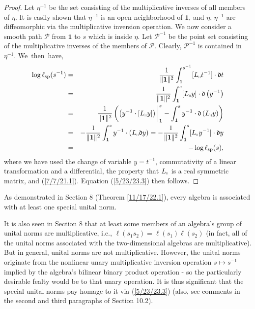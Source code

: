 \documentclass{amsart}
\numberwithin{equation}{section}
\theoremstyle{definition}
\numberwithin{theorem}{section}
\begin{document}
\begin{proof}
Let $\eta^{-1}$ be the set consisting of the multiplicative inverses of all members of $\eta$.  It is easily shown that $\eta^{-1}$ is an open neighborhood of $\mathbf{1}$, and $\eta$, $\eta^{-1}$ are diffeomorphic via the multiplicative inversion operation.  
We now consider a smooth path $\mathcal{P}$ from $\mathbf{1}$ to $s$ which is inside $\eta$.  Let $\mathcal{P}^{-1}$ be the point set consisting of the multiplicative inverses of the members of $\mathcal{P}$.  Clearly, $\mathcal{P}^{-1}$ is contained in $\eta^{-1}$. 
\mbox{We then have,} \begin{eqnarray}  \log \ell_{\rm sp}(s^{-1})   &=&   \frac{1}{\|{\bf 1}\|^2} \int_{\bf 1}^{s^{-1}} [L_{\shortparallel}t^{-1}] \cdot \mathfrak{d}t \nonumber \\ &=&  \frac{1}{\|{\bf 1}\|^2} \int_{\bf 1}^s [L_{\shortparallel}y]\cdot \mathfrak{d}\left(y^{-1}\right) \nonumber \\ &=&  \frac{1}{\|{\bf 1}\|^2}\left(\left(y^{-1}\cdot [L_{\shortparallel}y]\right)\bigg|_{\bf 1}^s - \int_{\bf 1}^s y^{-1}\cdot \mathfrak{d}\left(L_{\shortparallel}y\right)\right)   \nonumber \\ &=& -\frac{1}{\|{\bf 1}\|^2} \int_{\bf 1}^s y^{-1}\cdot (L_{\shortparallel}\mathfrak{d}y) = -\frac{1}{\|{\bf 1}\|^2} \int_{\bf 1}^s [L_{\shortparallel}y^{-1}] \cdot \mathfrak{d}y  \nonumber \\ &=& -\log \ell_{\rm sp}(s),\label{4/2/23.5} \end{eqnarray} where we have used the change of variable $y=t^{-1}$, commutativity of a linear transformation and a differential, the property that $L_{\shortparallel}$ is a real symmetric matrix, and  (\ref{7/7/21.1}).  Equation (\ref{5/23/23.3}) then follows.
\end{proof}

As demonstrated in Section 8 (Theorem \ref{11/17/22.1}), every algebra is associated with at least one special unital norm.

It is also seen in Section 8 that at least some members of an algebra's group of unital norms are multiplicative, i.e., $\ell(s_1s_2) = \ell(s_1)\ell(s_2)$ (in fact, all of the unital norms associated with the two-dimensional algebras are multiplicative).   But in general, unital norms are not multiplicative.  However, the unital norms originate from the nonlinear unary multiplicative inversion operation $s\mapsto s^{-1}$ implied by the algebra's bilinear binary product operation - so the particularly desirable fealty would be to that unary operation.  It is thus significant that the special unital norms pay homage to it via (\ref{5/23/23.3}) (also, see comments in the second and third paragraphs of Section 10.2).
\end{document}
